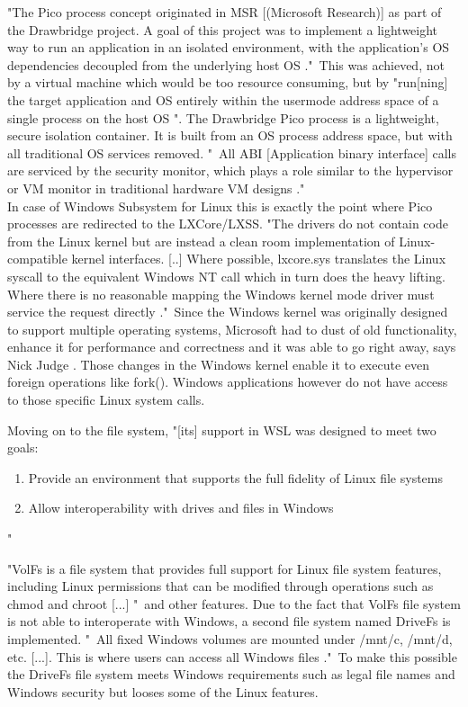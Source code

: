 \documentclass[utf8,biblatex, ngerman, english]{lni}
\begin{document}
"The Pico process concept originated in MSR [(Microsoft Research)] as part of the Drawbridge project. A goal of this project was to implement a lightweight way to run an application in an isolated environment, with the application’s OS dependencies decoupled from the underlying host OS \cite{Ha16a}."\ This was achieved, not by a virtual machine which would be too resource consuming, but by "run[ning] the target application and OS entirely within the usermode address space of a single process on the host OS \cite{Ha16a}". The Drawbridge Pico process is a lightweight, secure isolation container. It is built from an OS process address space, but with all traditional OS services removed. "\ All ABI [Application binary interface] calls are serviced by the security monitor, which plays a role similar to the hypervisor or VM monitor in traditional hardware VM designs \cite{11}."\\
In case of Windows Subsystem for Linux this is exactly the point where Pico processes are redirected to the LXCore/LXSS. "The drivers do not contain code from the Linux kernel but are instead a clean room implementation of Linux-compatible kernel interfaces. [..] Where possible, lxcore.sys translates the Linux syscall to the equivalent Windows NT call which in turn does the heavy lifting. Where there is no reasonable mapping the Windows kernel mode driver must service the request directly \cite{Ha16b}."\ Since the Windows kernel was originally designed to support multiple operating systems, Microsoft had to dust of old functionality, enhance it for performance and correctness and it was able to go right away, says Nick Judge \cite{Ha16a}. Those changes in the Windows kernel enable it to execute even foreign operations like fork(). Windows applications however do not have access to those specific Linux system calls.

Moving on to the file system, "[its] support in WSL was designed to meet two goals:
\begin{enumerate}
    \item Provide an environment that supports the full fidelity of Linux file systems
    \item Allow interoperability with drives and files in Windows 
\end{enumerate} \cite{Ha16b}"

"VolFs is a file system that provides full support for Linux file system features, including Linux permissions that can be modified through operations such as chmod and chroot [...] \cite{Ha16b}"\ and other features. Due to the fact that VolFs file system is not able to interoperate with Windows, a second file system named DriveFs is implemented. "\ All fixed Windows volumes are mounted under /mnt/c, /mnt/d, etc. [...]. This is where users can access all Windows files \cite{Ha16b}."\ To make this possible the DriveFs file system meets Windows requirements such as legal file names and Windows security but looses some of the Linux features.
\end{document}
